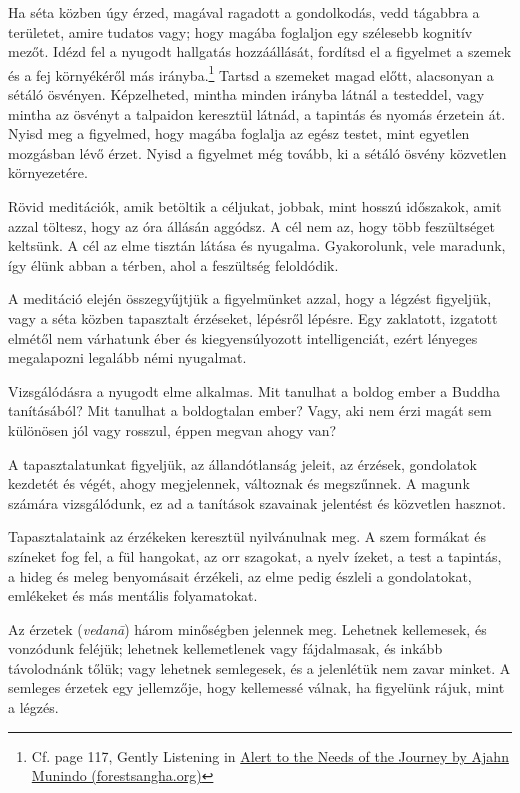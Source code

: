 Ha séta közben úgy érzed, magával ragadott a gondolkodás, vedd tágabbra
a területet, amire tudatos vagy; hogy magába foglaljon egy szélesebb
kognitív mezőt. Idézd fel a nyugodt hallgatás hozzáállását, fordítsd el
a figyelmet a szemek és a fej környékéről más irányba.\footnote{Cf. page
  117, Gently Listening in
  \href{https://forestsangha.org/teachings/books/alert-to-the-needs-of-the-journey?language=English}{Alert
  to the Needs of the Journey by Ajahn Munindo (forestsangha.org)}}
Tartsd a szemeket magad előtt, alacsonyan a sétáló ösvényen.
Képzelheted, mintha minden irányba látnál a testeddel, vagy mintha az
ösvényt a talpaidon keresztül látnád, a tapintás és nyomás érzetein át.
Nyisd meg a figyelmed, hogy magába foglalja az egész testet, mint
egyetlen mozgásban lévő érzet. Nyisd a figyelmet még tovább, ki a sétáló
ösvény közvetlen környezetére.

Rövid meditációk, amik betöltik a céljukat, jobbak, mint hosszú
időszakok, amit azzal töltesz, hogy az óra állásán aggódsz. A cél nem
az, hogy több feszültséget keltsünk. A cél az elme tisztán látása és
nyugalma. Gyakorolunk, vele maradunk, így élünk abban a térben, ahol a
feszültség feloldódik.


A meditáció elején összegyűjtjük a figyelmünket azzal, hogy a légzést
figyeljük, vagy a séta közben tapasztalt érzéseket, lépésről lépésre.
Egy zaklatott, izgatott elmétől nem várhatunk éber és kiegyensúlyozott
intelligenciát, ezért lényeges megalapozni legalább némi nyugalmat.

Vizsgálódásra a nyugodt elme alkalmas. Mit tanulhat a boldog ember a
Buddha tanításából? Mit tanulhat a boldogtalan ember? Vagy, aki nem érzi
magát sem különösen jól vagy rosszul, éppen megvan ahogy van?

A tapasztalatunkat figyeljük, az állandótlanság jeleit, az érzések,
gondolatok kezdetét és végét, ahogy megjelennek, változnak és
megszűnnek. A magunk számára vizsgálódunk, ez ad a tanítások szavainak
jelentést és közvetlen hasznot.

Tapasztalataink az érzékeken keresztül nyilvánulnak meg. A szem formákat
és színeket fog fel, a fül hangokat, az orr szagokat, a nyelv ízeket, a
test a tapintás, a hideg és meleg benyomásait érzékeli, az elme pedig
észleli a gondolatokat, emlékeket és más mentális folyamatokat.


Az érzetek (\emph{vedanā}) három minőségben jelennek meg. Lehetnek
kellemesek, és vonzódunk feléjük; lehetnek kellemetlenek vagy
fájdalmasak, és inkább távolodnánk tőlük; vagy lehetnek semlegesek, és a
jelenlétük nem zavar minket. A semleges érzetek egy jellemzője, hogy
kellemessé válnak, ha figyelünk rájuk, mint a légzés.

